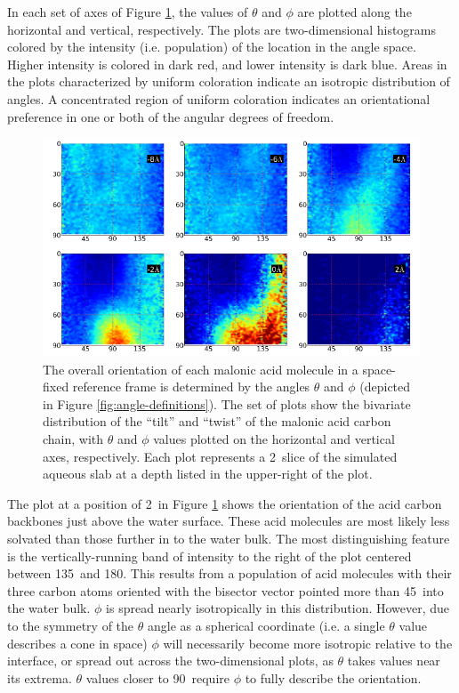 In each set of axes of Figure \ref{fig:backbone-theta-phi}, the values of $\theta$ and $\phi$ are plotted along the horizontal and vertical, respectively. The plots are two-dimensional histograms colored by the intensity (i.e. population) of the location in the angle space. Higher intensity is colored in dark red, and lower intensity is dark blue. Areas in the plots characterized by uniform coloration indicate an isotropic distribution of angles. A concentrated region of uniform coloration indicates an orientational preference in one or both of the angular degrees of freedom.

\begin{figure}[h!]
	\begin{center}
		\includegraphics[scale=1.0]{images/malonic-angles/carbonbackbone-theta-phi.png}
		\caption{The overall orientation of each malonic acid molecule in a space-fixed reference frame is determined by the angles $\theta$ and $\phi$ (depicted in Figure \ref{fig:angle-definitions}). The set of plots show the bivariate distribution of the ``tilt'' and ``twist'' of the malonic acid carbon chain, with $\theta$ and $\phi$ values plotted on the horizontal and vertical axes, respectively. Each plot represents a 2\angs~slice of the simulated aqueous slab at a depth listed in the upper-right of the plot.}
		\label{fig:backbone-theta-phi}
	\end{center}
\end{figure}

The plot at a position of 2\angs~in Figure \ref{fig:backbone-theta-phi} shows the orientation of the acid carbon backbones just above the water surface. These acid molecules are most likely less solvated than those further in to the water bulk. The most distinguishing feature is the vertically-running band of intensity to the right of the plot centered between 135\textdegree~and 180\textdegree. This results from a population of acid molecules with their three carbon atoms oriented with the bisector vector pointed more than 45\textdegree~into the water bulk. $\phi$ is spread nearly isotropically in this distribution. However, due to the symmetry of the $\theta$ angle as a spherical coordinate (i.e. a single $\theta$ value describes a cone in space) $\phi$ will necessarily become more isotropic relative to the interface, or spread out across the two-dimensional plots, as $\theta$ takes values near its extrema. $\theta$ values closer to 90\textdegree~require $\phi$ to fully describe the orientation.

